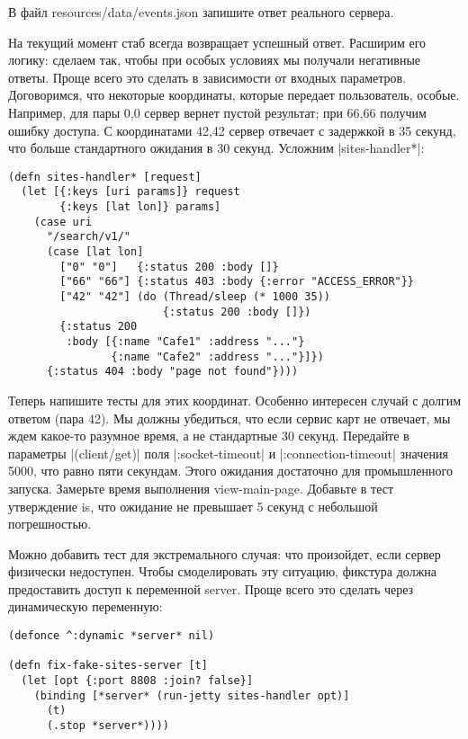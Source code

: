 В файл resources/data/events.json запишите ответ реального сервера.

На текущий момент стаб всегда возвращает успешный ответ. Расширим его логику:
сделаем так, чтобы при особых условиях мы получали негативные ответы. Проще
всего это сделать в зависимости от входных параметров. Договоримся, что
некоторые координаты, которые передает пользователь, особые. Например, для пары
0,0 сервер вернет пустой результат; при 66,66 получим ошибку доступа. С
координатами 42,42 сервер отвечает с задержкой в 35 секунд, что больше
стандартного ожидания в 30 секунд. Усложним \spverb|sites-handler*|:

\begin{verbatim}
(defn sites-handler* [request]
  (let [{:keys [uri params]} request
        {:keys [lat lon]} params]
    (case uri
      "/search/v1/"
      (case [lat lon]
        ["0" "0"]   {:status 200 :body []}
        ["66" "66"] {:status 403 :body {:error "ACCESS_ERROR"}}
        ["42" "42"] (do (Thread/sleep (* 1000 35))
                        {:status 200 :body []})
        {:status 200
         :body [{:name "Cafe1" :address "..."}
                {:name "Cafe2" :address "..."}]})
      {:status 404 :body "page not found"})))
\end{verbatim}

Теперь напишите тесты для этих координат. Особенно интересен случай с долгим
ответом (пара 42). Мы должны убедиться, что если сервис карт не отвечает, мы
ждем какое-то разумное время, а не стандартные 30 секунд. Передайте в параметры
\spverb|(client/get)| поля \spverb|:socket-timeout| и \spverb|:connection-timeout| значения 5000, что
равно пяти секундам. Этого ожидания достаточно для промышленного
запуска. Замерьте время выполнения view-main-page. Добавьте в тест утверждение
is, что ожидание не превышает 5 секунд с небольшой погрешностью.

Можно добавить тест для экстремального случая: что произойдет, если сервер
физически недоступен. Чтобы смоделировать эту ситуацию, фикстура должна
предоставить доступ к переменной server. Проще всего это сделать через
динамическую переменную:

\begin{verbatim}
(defonce ^:dynamic *server* nil)

(defn fix-fake-sites-server [t]
  (let [opt {:port 8808 :join? false}]
    (binding [*server* (run-jetty sites-handler opt)]
      (t)
      (.stop *server*))))
\end{verbatim}

